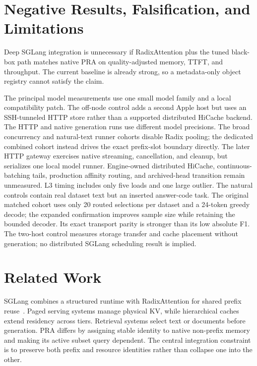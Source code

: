 \documentclass[10pt]{article}
\begin{document}
\section{Negative Results, Falsification, and Limitations}
Deep SGLang integration is unnecessary if RadixAttention plus the tuned
black-box path matches native PRA on quality-adjusted memory, TTFT, and
throughput. The current baseline is already strong, so a metadata-only object
registry cannot satisfy the claim.

The principal model measurements use one small model family and a local
compatibility patch. The off-node control adds a second Apple host but uses an
SSH-tunneled HTTP store rather than a supported distributed HiCache backend.
The HTTP and native generation runs use different model precisions. The
broad concurrency and natural-text runner cohorts disable Radix pooling; the
dedicated combined cohort instead drives the exact prefix-slot boundary
directly. The later HTTP gateway exercises native streaming, cancellation, and
cleanup, but serializes one local model runner. Engine-owned distributed
HiCache, continuous-batching tails, production affinity routing, and
archived-head transition remain unmeasured. L3 timing includes only five
loads and one large outlier. The natural controls contain real dataset text
but an inserted answer-code task. The original matched cohort uses only 20
routed selections per dataset and a 24-token greedy decode; the expanded
confirmation improves sample size while retaining the bounded decoder. Its
exact transport parity is stronger than its low absolute F1. The two-host
control measures storage transfer and cache placement without generation; no
distributed SGLang scheduling result is implied.

\section{Related Work}
SGLang combines a structured runtime with RadixAttention for shared prefix
reuse~\cite{zheng2024sglang}. Paged serving systems manage physical KV, while
hierarchical caches extend residency across tiers. Retrieval systems select
text or documents before generation. PRA differs by assigning stable identity
to native non-prefix memory and making its active subset query dependent. The
central integration constraint is to preserve both prefix and resource
identities rather than collapse one into the other.
\end{document}
